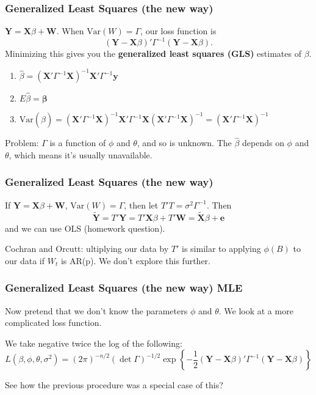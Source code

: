 \documentclass{beamer}
\begin{document}

\begin{frame}
\frametitle{Generalized Least Squares (the new way)}

$\mathbf{Y} = \mathbf{X}\beta + \mathbf{W}$. When $\text{Var}(W) = \Gamma$, our loss function is
\[
(\mathbf{Y} - \mathbf{X}\beta )' \Gamma^{-1} (\mathbf{Y} - \mathbf{X}\beta ) .
\]
Minimizing this gives you the {\bf generalized least squares (GLS)} estimates of $\beta$.
\newline

\begin{enumerate}
\item $\hat{\beta} = (\mathbf{X}' \Gamma^{-1} \mathbf{X} )^{-1} \mathbf{X}'\Gamma^{-1}  \mathbf{y}$
\item $E\hat{\beta} = \mathbf{\beta}$
\item $\text{Var}(\hat{\beta}) = (\mathbf{X}' \Gamma^{-1} \mathbf{X} )^{-1} \mathbf{X}'\Gamma^{-1}\mathbf{X}(\mathbf{X}'\Gamma^{-1} \mathbf{X} )^{-1} = (\mathbf{X}'\Gamma^{-1} \mathbf{X} )^{-1}$
\end{enumerate}

Problem: $\Gamma$ is a function of $\phi$ and $\theta$, and so is unknown. The $\hat{\beta}$ depends on $\phi$ and $\theta$, which means it's usually unavailable.

\end{frame}

\begin{frame}
\frametitle{Generalized Least Squares (the new way)}

If $\mathbf{Y} = \mathbf{X}\beta + \mathbf{W}$, $\text{Var}(W) = \Gamma$, then let $T'T = \sigma^2\Gamma^{-1}$. Then
\[
\tilde{\mathbf{Y}} = T'\mathbf{Y} = T'\mathbf{X}\beta + T'\mathbf{W} = \tilde{\mathbf{X}}\beta + \mathbf{e} 
\]
and we can use OLS (homework question). 
\newline

Cochran and Orcutt: ultiplying our data by $T'$ is similar to applying $\phi(B)$ to our data if $W_t$ is AR(p). We don't explore this further.

\end{frame}


\begin{frame}
\frametitle{Generalized Least Squares (the new way) MLE}

Now pretend that we don't know the parameters $\phi$ and $\theta$. We look at a more complicated loss function.
\newline

We take negative twice the log of the following:
\[
L(\beta, \phi, \theta,\sigma^2) = (2 \pi)^{-n/2} (\det \Gamma)^{-1/2}\exp\left\{-\frac{1}{2} (\mathbf{Y} - \mathbf{X}\beta )' \Gamma^{-1} (\mathbf{Y} - \mathbf{X}\beta )  \right\}
\]

See how the previous procedure was a special case of this? 


\end{frame}
\end{document}
